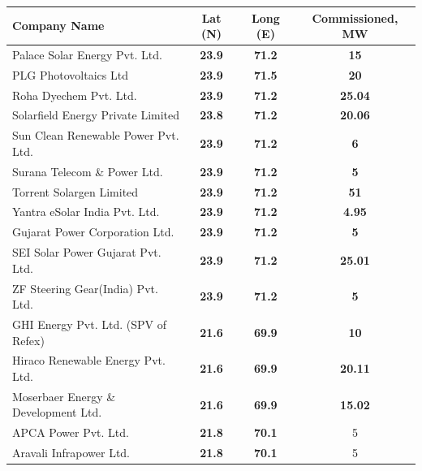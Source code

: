 \begin{table}[H]
  \centering
    \begin{tabular}{|l|c|c|c|}
    \hline
    \textbf{Company Name} & \textbf{Lat (N)} & \textbf{Long (E)} & \textbf{Commissioned, MW} \bigstrut\\
    \hline
    Palace Solar Energy Pvt. Ltd. & \textbf{23.9} & \textbf{71.2} & \textbf{15} \bigstrut\\
    \hline
    PLG Photovoltaics Ltd & \textbf{23.9} & \textbf{71.5} & \textbf{20} \bigstrut\\
    \hline
    Roha Dyechem Pvt. Ltd. & \textbf{23.9} & \textbf{71.2} & \textbf{25.04} \bigstrut\\
    \hline
    Solarfield Energy Private Limited & \textbf{23.8} & \textbf{71.2} & \textbf{20.06} \bigstrut\\
    \hline
    Sun Clean Renewable Power Pvt. Ltd. & \textbf{23.9} & \textbf{71.2} & \textbf{6} \bigstrut\\
    \hline
    Surana Telecom \& Power Ltd. & \textbf{23.9} & \textbf{71.2} & \textbf{5} \bigstrut\\
    \hline
    Torrent Solargen Limited & \textbf{23.9} & \textbf{71.2} & \textbf{51} \bigstrut\\
    \hline
    Yantra eSolar India Pvt. Ltd. & \textbf{23.9} & \textbf{71.2} & \textbf{4.95} \bigstrut\\
    \hline
    Gujarat Power Corporation Ltd. & \textbf{23.9} & \textbf{71.2} & \textbf{5} \bigstrut\\
    \hline
    SEI Solar Power Gujarat Pvt. Ltd. & \textbf{23.9} & \textbf{71.2} & \textbf{25.01} \bigstrut\\
    \hline
    ZF Steering Gear(India) Pvt. Ltd. & \textbf{23.9} & \textbf{71.2} & \textbf{5} \bigstrut\\
    \hline
    GHI Energy Pvt. Ltd. (SPV of Refex) & \textbf{21.6} & \textbf{69.9} & \textbf{10} \bigstrut\\
    \hline
    Hiraco Renewable Energy Pvt. Ltd. & \textbf{21.6} & \textbf{69.9} & \textbf{20.11} \bigstrut\\
    \hline
    Moserbaer Energy \& Development Ltd. & \textbf{21.6} & \textbf{69.9} & \textbf{15.02} \bigstrut\\
    \hline
    APCA Power Pvt. Ltd. & \textbf{21.8} & \textbf{70.1} & 5 \bigstrut\\
    \hline
    Aravali Infrapower Ltd. & \textbf{21.8} & \textbf{70.1} & 5 \bigstrut\\

\end{tabular}
\end{table}
